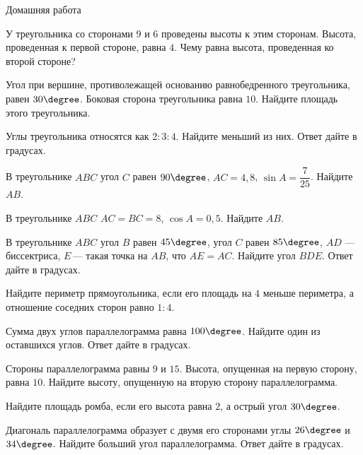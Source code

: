 \begin{homework}[number=1]
		\begin{listofex}
			\item Домашняя работа
		\end{listofex}
\end{homework}

\begin{class}[number=2]
	\begin{listofex}
		\item У треугольника со сторонами \( 9 \) и \( 6 \) проведены высоты к этим сторонам. Высота, проведенная к первой стороне, равна \( 4 \). Чему равна высота, проведенная ко второй стороне?
		\item Угол при вершине, противолежащей основанию равнобедренного треугольника, равен \( 30\degree \). Боковая сторона треугольника равна \( 10 \). Найдите площадь этого треугольника.
		\item Углы треугольника относятся как \( 2:3:4 \). Найдите меньший из них. Ответ дайте в градусах.
		\item В треугольнике \( ABC \) угол \( C \) равен \( 90\degree \), \( AC=4,8 \),  \( \sin A=\dfrac{7}{25} \).  Найдите \( AB \).
		\item В треугольнике \( ABC \) \( AC=BC=8 \),  \( \cos A=0,5 \). Найдите \( AB \).
		\item В треугольнике \( ABC \) угол \( B \) равен \( 45\degree \), угол \( C \) равен \( 85\degree \), \( AD \) --- биссектриса, \( E \) --- такая точка на \( AB \), что \( AE=AC \). Найдите угол \( BDE \). Ответ дайте в градусах.
		\item Найдите периметр прямоугольника, если его площадь на \( 4 \) меньше периметра, а отношение соседних сторон равно \( 1:4 \).
		\item Сумма двух углов параллелограмма равна \( 100\degree \). Найдите один из оставшихся углов. Ответ дайте в градусах.
		\item Стороны параллелограмма равны \( 9 \) и \( 15 \). Высота, опущенная на первую сторону, равна \( 10 \). Найдите высоту, опущенную на вторую сторону параллелограмма.
		\item Найдите площадь ромба, если его высота равна \( 2 \), а острый угол \( 30\degree \).
		\item Диагональ параллелограмма образует с двумя его сторонами углы \( 26\degree \) и \( 34\degree \). Найдите больший угол параллелограмма. Ответ дайте в градусах.

\end{listofex}
\end{class}
